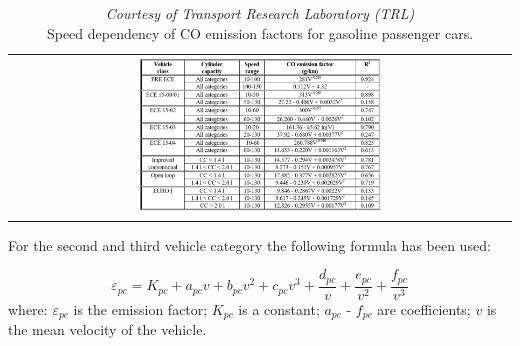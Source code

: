 \documentclass[journal]{IEEEtran}
\begin{document}
\begin{table}[tbp]
 \centering
 \begin{center}  
  \begin{tabular}{c}
      \includegraphics[width=0.5\textwidth]{figure/Emission_passvehicle_co.jpg}
  \end{tabular}
\end{center}  
\caption{\textit{Courtesy of Transport Research Laboratory (TRL)} \cite{bib:MEET001}\\Speed dependency of CO emission factors for gasoline passenger cars.}
  \label{tab:TabEmPassCarCo}
\end{table}
 For the second and third vehicle category the following formula has been used:

\begin{equation}
\varepsilon_{pc} = K_{pc} + a_{pc}v + b_{pc}v^2 + c_{pc}v^3 + \dfrac{d_{pc}}{v} + \dfrac{e_{pc}}{v^2} + \dfrac{f_{pc}}{v^3}
\end{equation}
where: $\varepsilon_{pc}$ is the emission factor;
$K_{pc}$ is a constant;
$a_{pc}$ - $f_{pc}$ are coefficients;
$v$ is the mean velocity of the vehicle.
\end{document}
